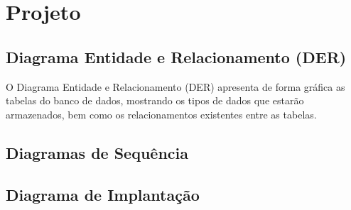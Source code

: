 \chapter{Projeto}

\section{Diagrama Entidade e Relacionamento (DER)}

O Diagrama Entidade e Relacionamento (DER) apresenta de forma gráfica as tabelas do banco de dados, mostrando os tipos de dados que estarão armazenados, bem como os relacionamentos existentes entre as tabelas.


\section{Diagramas de Sequência}

\section{Diagrama de Implantação}